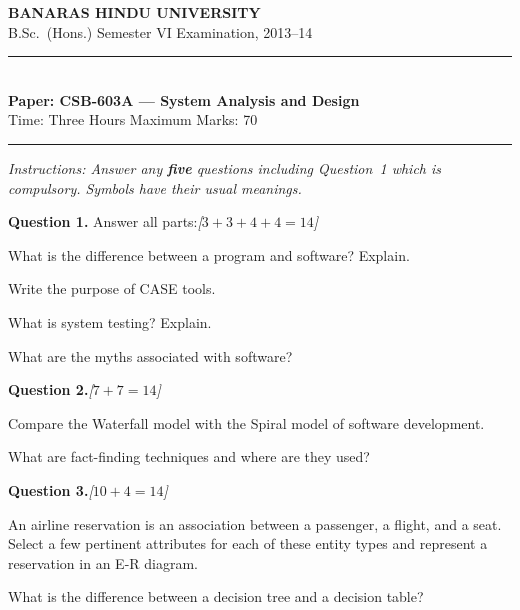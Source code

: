 \documentclass[11pt,a4paper]{article}
\newcommand{\pts}[1]{\hfill   \textit{[#1]}}
\begin{document}
\begin{center}
  {\large\bfseries BANARAS HINDU UNIVERSITY}\\[2pt]
  {
\normalsize B.Sc.\ (Hons.) Semester VI Examination, 2013--14}\\[6pt]
  \rule{0.8\linewidth}{0.5pt}\\[6pt]
  {\large\bfseries Paper: CSB-603A --- System Analysis and Design}\\[4pt]
  {
\normalsize Time: Three Hours \hfill Maximum Marks: 70}
\end{center}

\rule{\linewidth}{0.4pt}

\smallskip



\noindent   \textit{Instructions: Answer any   \textbf{five} questions including Question~1 which is compulsory. Symbols have their usual meanings.}

\bigskip




\noindent   \textbf{Question 1.} Answer all parts:\pts{$3+3+4+4=14$}

\begin{parts}
  \item What is the difference between a program and software? Explain.
  \item Write the purpose of CASE tools.
  \item What is system testing? Explain.
  \item What are the myths associated with software?
\end{parts}

\bigskip




\noindent   \textbf{Question 2.}\pts{$7+7=14$}

\begin{parts}
  \item Compare the Waterfall model with the Spiral model of software development.
  \item What are fact-finding techniques and where are they used?
\end{parts}

\bigskip




\noindent   \textbf{Question 3.}\pts{$10+4=14$}

\begin{parts}
  \item An airline reservation is an association between a passenger, a flight, and a seat. Select a few pertinent attributes for each of these entity types and represent a reservation in an E-R diagram.
  \item What is the difference between a decision tree and a decision table?
\end{parts}
\end{document}

